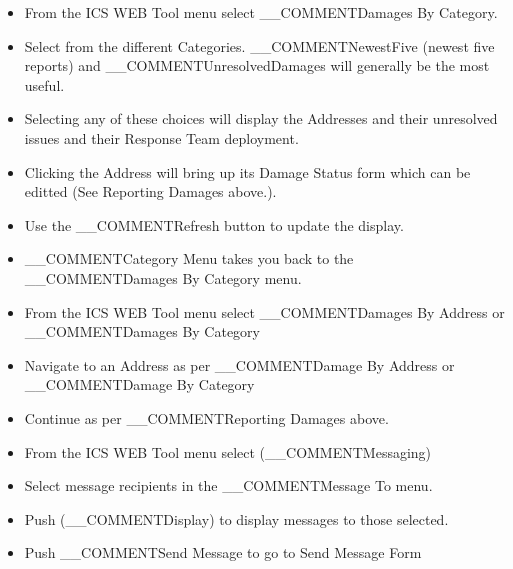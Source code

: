 \begin{itemize}
\item From the ICS WEB Tool menu select __COMMENT{Damages By Category}.
\item Select from the different Categories.  
__COMMENT{NewestFive} (newest five reports) and 
__COMMENT{UnresolvedDamages} will generally be the most useful.
\item Selecting any of these choices will display the Addresses
and their unresolved issues and their Response Team deployment.
\item Clicking the Address will bring up its Damage Status form 
which can be editted (See Reporting Damages above.).
\item Use the __COMMENT{Refresh} button to update the display.
\item __COMMENT{Category Menu} takes you back to the  __COMMENT{Damages By Category} menu.
\end{itemize}

\begin{itemize}
\item From the ICS WEB Tool menu select 
__COMMENT{Damages By Address} or __COMMENT{Damages By Category}
\item Navigate to an Address as per __COMMENT{Damage By Address}
or __COMMENT{Damage By Category}
\item Continue as per __COMMENT{Reporting Damages} above.
\end{itemize}

\begin{itemize}
\item From the ICS WEB Tool menu select (__COMMENT{Messaging})
\item Select message recipients in the __COMMENT{Message To} menu.
\item Push (__COMMENT{Display}) to display messages to those selected.
\item Push __COMMENT{Send Message} to go to Send Message Form
\end{itemize}

